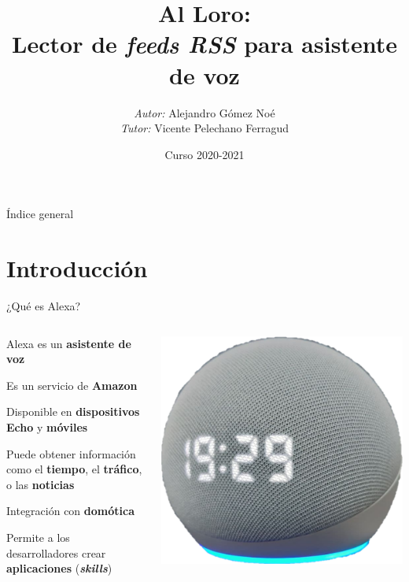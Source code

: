 \documentclass{beamer}
\title{Al Loro: \\Lector de \textit{feeds RSS} para asistente de voz}
\author[Alejandro Gómez Noé]{\emph{Autor:} Alejandro Gómez Noé\\[0.3em]\emph{Tutor:} Vicente Pelechano Ferragud}
\institute{ETSINF - Universidad Politécnica de Valencia}
\date{Curso 2020-2021}
\begin{document}
  
  \begin{frame}
    \titlepage
  \end{frame}
  
  \begin{frame}{Índice general}
    \tableofcontents
  \end{frame}

  \section{Introducción}
 
  \begin{frame}{¿Qué es Alexa?}
    \begin{columns}[c]
      \begin{column}{.51\textwidth}
        \begin{itemize}
          \setlength\itemsep{1.5em}
          {
          \item Alexa es un \textbf{asistente de voz}
          \item Es un servicio de \textbf{Amazon}
          \item Disponible en \textbf{dispositivos Echo} y \textbf{móviles}
          }
          {
          \item Puede obtener información como el \textbf{tiempo}, el \textbf{tráfico}, o las \textbf{noticias}
          \item Integración con \textbf{domótica}
          \item Permite a los desarrolladores crear \textbf{aplicaciones} (\textbf{\emph{skills}})
          }
        \end{itemize}
      \end{column}
      \begin{column}{.49\textwidth}
        {
          \includegraphics[width=.46\textwidth]{echo-dot.png}
}
\end{column}
\end{columns}
\end{frame}
\end{document}
